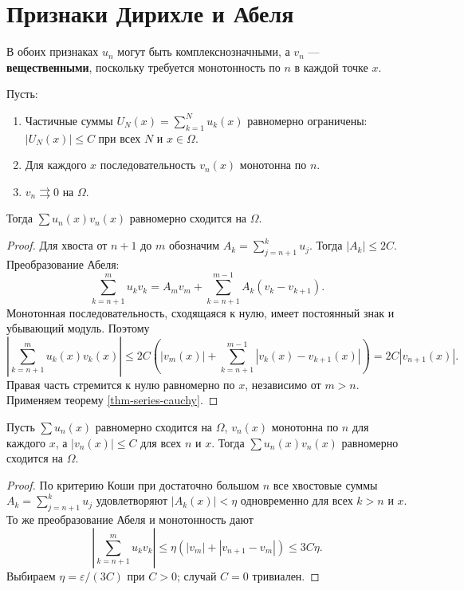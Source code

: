 \section{Признаки Дирихле и Абеля}\label{sec-series-03}

В обоих признаках \(u_n\) могут быть комплекснозначными, а \(v_n\) --- \textbf{вещественными}, поскольку требуется монотонность по \(n\) в каждой точке \(x\).

\begin{theorem}\label{thm-dirichlet}

Пусть:

\begin{enumerate}
\def\labelenumi{\arabic{enumi}.}
\tightlist
\item
  Частичные суммы \(U_N(x)=\sum_{k=1}^N u_k(x)\) равномерно ограничены: \(|U_N(x)|\le C\) при всех \(N\) и \(x\in\Omega\).
\item
  Для каждого \(x\) последовательность \(v_n(x)\) монотонна по \(n\).
\item
  \(v_n\rightrightarrows0\) на \(\Omega\).
\end{enumerate}

Тогда \(\sum u_n(x)v_n(x)\) равномерно сходится на \(\Omega\).

\end{theorem}

\begin{proof}

Для хвоста от \(n+1\) до \(m\) обозначим \(A_k=\sum_{j=n+1}^k u_j\). Тогда \(|A_k|\le2C\). Преобразование Абеля: \[
\sum_{k=n+1}^m u_kv_k=A_mv_m+\sum_{k=n+1}^{m-1}A_k(v_k-v_{k+1}).
\] Монотонная последовательность, сходящаяся к нулю, имеет постоянный знак и убывающий модуль. Поэтому \[
\left|\sum_{k=n+1}^m u_k(x)v_k(x)\right|
\le2C\left(|v_m(x)|+\sum_{k=n+1}^{m-1}|v_k(x)-v_{k+1}(x)|\right)
=2C|v_{n+1}(x)|.
\] Правая часть стремится к нулю равномерно по \(x\), независимо от \(m>n\). Применяем теорему \ref{thm-series-cauchy}.

\end{proof}

\begin{theorem}\label{thm-abel-test}

Пусть \(\sum u_n(x)\) равномерно сходится на \(\Omega\), \(v_n(x)\) монотонна по \(n\) для каждого \(x\), а \(|v_n(x)|\le C\) для всех \(n\) и \(x\). Тогда \(\sum u_n(x)v_n(x)\) равномерно сходится на \(\Omega\).

\end{theorem}

\begin{proof}

По критерию Коши при достаточно большом \(n\) все хвостовые суммы \(A_k=\sum_{j=n+1}^k u_j\) удовлетворяют \(|A_k(x)|<\eta\) одновременно для всех \(k>n\) и \(x\). То же преобразование Абеля и монотонность дают \[
\left|\sum_{k=n+1}^m u_kv_k\right|
\le\eta\left(|v_m|+|v_{n+1}-v_m|\right)\le3C\eta.
\] Выбираем \(\eta=\varepsilon/(3C)\) при \(C>0\); случай \(C=0\) тривиален.

\end{proof}
